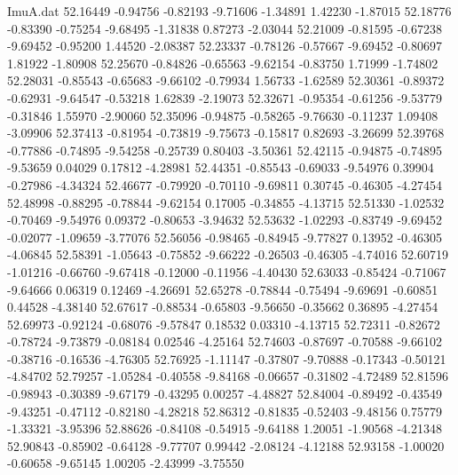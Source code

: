 \begin{filecontents}{ImuA.dat}
  52.16449   -0.94756   -0.82193   -9.71606   -1.34891    1.42230   -1.87015
  52.18776   -0.83390   -0.75254   -9.68495   -1.31838    0.87273   -2.03044
  52.21009   -0.81595   -0.67238   -9.69452   -0.95200    1.44520   -2.08387
  52.23337   -0.78126   -0.57667   -9.69452   -0.80697    1.81922   -1.80908
  52.25670   -0.84826   -0.65563   -9.62154   -0.83750    1.71999   -1.74802
  52.28031   -0.85543   -0.65683   -9.66102   -0.79934    1.56733   -1.62589
  52.30361   -0.89372   -0.62931   -9.64547   -0.53218    1.62839   -2.19073
  52.32671   -0.95354   -0.61256   -9.53779   -0.31846    1.55970   -2.90060
  52.35096   -0.94875   -0.58265   -9.76630   -0.11237    1.09408   -3.09906
  52.37413   -0.81954   -0.73819   -9.75673   -0.15817    0.82693   -3.26699
  52.39768   -0.77886   -0.74895   -9.54258   -0.25739    0.80403   -3.50361
  52.42115   -0.94875   -0.74895   -9.53659    0.04029    0.17812   -4.28981
  52.44351   -0.85543   -0.69033   -9.54976    0.39904   -0.27986   -4.34324
  52.46677   -0.79920   -0.70110   -9.69811    0.30745   -0.46305   -4.27454
  52.48998   -0.88295   -0.78844   -9.62154    0.17005   -0.34855   -4.13715
  52.51330   -1.02532   -0.70469   -9.54976    0.09372   -0.80653   -3.94632
  52.53632   -1.02293   -0.83749   -9.69452   -0.02077   -1.09659   -3.77076
  52.56056   -0.98465   -0.84945   -9.77827    0.13952   -0.46305   -4.06845
  52.58391   -1.05643   -0.75852   -9.66222   -0.26503   -0.46305   -4.74016
  52.60719   -1.01216   -0.66760   -9.67418   -0.12000   -0.11956   -4.40430
  52.63033   -0.85424   -0.71067   -9.64666    0.06319    0.12469   -4.26691
  52.65278   -0.78844   -0.75494   -9.69691   -0.60851    0.44528   -4.38140
  52.67617   -0.88534   -0.65803   -9.56650   -0.35662    0.36895   -4.27454
  52.69973   -0.92124   -0.68076   -9.57847    0.18532    0.03310   -4.13715
  52.72311   -0.82672   -0.78724   -9.73879   -0.08184    0.02546   -4.25164
  52.74603   -0.87697   -0.70588   -9.66102   -0.38716   -0.16536   -4.76305
  52.76925   -1.11147   -0.37807   -9.70888   -0.17343   -0.50121   -4.84702
  52.79257   -1.05284   -0.40558   -9.84168   -0.06657   -0.31802   -4.72489
  52.81596   -0.98943   -0.30389   -9.67179   -0.43295    0.00257   -4.48827
  52.84004   -0.89492   -0.43549   -9.43251   -0.47112   -0.82180   -4.28218
  52.86312   -0.81835   -0.52403   -9.48156    0.75779   -1.33321   -3.95396
  52.88626   -0.84108   -0.54915   -9.64188    1.20051   -1.90568   -4.21348
  52.90843   -0.85902   -0.64128   -9.77707    0.99442   -2.08124   -4.12188
  52.93158   -1.00020   -0.60658   -9.65145    1.00205   -2.43999   -3.75550

\end{filecontents}
